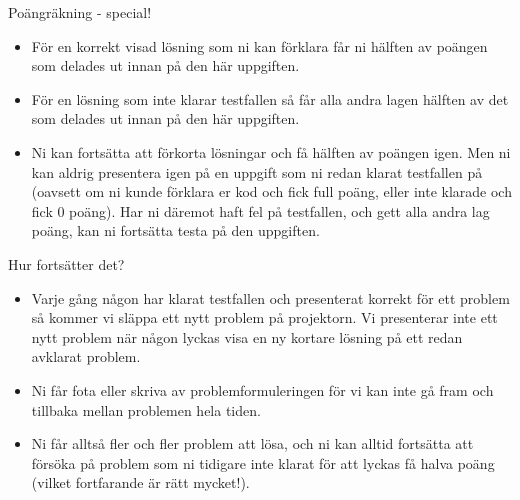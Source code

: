 \documentclass[10pt]{beamer}
\begin{document}
\begin{frame}[fragile]{Poängräkning - special!}

\begin{itemize}
\item För en korrekt visad lösning som ni kan förklara får ni hälften av poängen som delades ut innan på den här uppgiften.  
\item För en lösning som inte klarar testfallen så får alla andra lagen hälften av det som delades ut innan på den här uppgiften. 
\item Ni kan fortsätta att förkorta lösningar och få hälften av poängen igen. Men ni kan aldrig presentera igen på en uppgift som ni redan klarat testfallen på (oavsett om ni kunde förklara er kod och fick full poäng, eller inte klarade och fick 0 poäng). Har ni däremot haft fel på testfallen, och gett alla andra lag poäng, kan ni fortsätta testa på den uppgiften.
\end{itemize}
\end{frame}




\begin{frame}[fragile]{Hur fortsätter det?}

\begin{itemize}
\item Varje gång någon har klarat testfallen och presenterat korrekt för ett problem så kommer vi släppa ett nytt problem på projektorn. Vi presenterar inte ett nytt problem när någon lyckas visa en ny kortare lösning på ett redan avklarat problem.
\item Ni får fota eller skriva av problemformuleringen för vi kan inte gå fram och tillbaka mellan problemen hela tiden. 
\item Ni får alltså fler och fler problem att lösa, och ni kan alltid fortsätta att försöka på problem som ni tidigare inte klarat för att lyckas få halva poäng (vilket fortfarande är rätt mycket!).
\end{itemize}
\end{frame}
\end{document}
